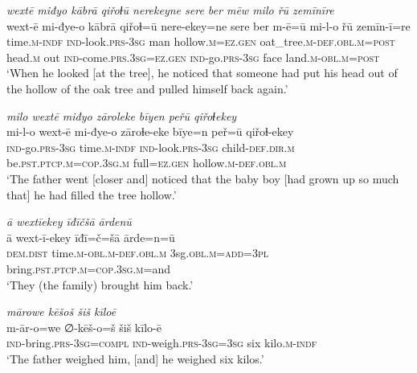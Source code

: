 \ea \label{ZB.48}
\textit{wextē miđyo kābrā qiřoɫū nerekeyne sere ber mēw milo řū zemīnīre} \\ 
\gll wext-ē mi-đye-o kābrā qiřoɫ=ū nere-ekey=ne sere ber m-ē=ū mi-l-o řū zemīn-ī=re \\ 
 time\textsc{.m}\textsc{-indf} \textsc{ind-}look\textsc{.prs}\textsc{-3sg} man hollow\textsc{.m}\textsc{\textsc{=ez.gen}} oat\_tree\textsc{.m}\textsc{-def}\textsc{.obl}\textsc{.m}\textsc{=\textsc{post}} head\textsc{.m} out \textsc{ind-}come\textsc{.prs}\textsc{.3sg}\textsc{\textsc{=ez.gen}} \textsc{ind-}go\textsc{.prs}\textsc{-3sg} face land\textsc{.m}\textsc{-obl}\textsc{.m}\textsc{=\textsc{post}} \\ 
\glt `When he looked [at the tree], he noticed that someone had put his head out of the hollow of the oak tree and pulled himself back again.'
\z 
 
\ea \label{ZB.49}
\textit{milo wextē miđyo zāroleke bīyen peřū qiřoɫekey} \\ 
\gll mi-l-o wext-ē mi-đye-o zāroɫe-eke bīye=n peř=ū qiřoɫ-ekey \\ 
 \textsc{ind-}go\textsc{.prs}\textsc{-3sg} time\textsc{.m}\textsc{-indf} \textsc{ind-}look\textsc{.prs}\textsc{-3sg} child\textsc{-def}\textsc{.dir}\textsc{.m} be\textsc{.pst}\textsc{.ptcp}\textsc{.m}\textsc{=cop}\textsc{.3sg}\textsc{.m} full\textsc{\textsc{=ez.gen}} hollow\textsc{.m}\textsc{-def}\textsc{.obl}\textsc{.m} \\ 
\glt `The father went [closer and] noticed that the baby boy [had grown up so much that] he had filled the tree hollow.'
\z 
 
\ea \label{ZB.50}
\textit{ā wextīekey īđīčšā ārdenū} \\ 
\gll ā wext-ī-ekey īđī=č=šā ārde=n=ū \\ 
 \textsc{dem.dist} time\textsc{.m}\textsc{-obl}\textsc{.m}\textsc{-def}\textsc{.obl}\textsc{.m} 3sg\textsc{.obl}\textsc{.m}\textsc{=add}\textsc{=3pl} bring\textsc{.pst}\textsc{.ptcp}\textsc{.m}\textsc{=cop}\textsc{.3sg}\textsc{.m}=and \\ 
\glt `They (the family) brought him back.'
\z 
 
\ea \label{ZB.51}
\textit{mārowe kēšoš šiš kīloē} \\ 
\gll m-ār-o=we ∅-kēš-o=š šiš kīlo-ē \\ 
 \textsc{ind-}bring\textsc{.prs}\textsc{-3sg}\textsc{=compl} \textsc{ind-}weigh\textsc{.prs}\textsc{-3sg}\textsc{=3sg} six kilo\textsc{.m}\textsc{-indf} \\ 
\glt `The father weighed him, [and] he weighed six kilos.'
\z 
 
